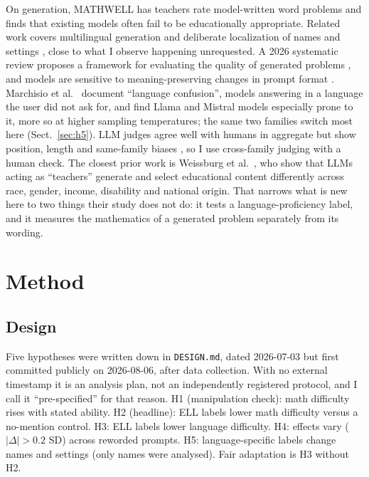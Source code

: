 \documentclass[runningheads,a4paper]{llncs}
\begin{document}
On generation, MATHWELL \cite{christ2024} has teachers rate model-written word problems and finds that existing models often fail to be educationally appropriate. Related work covers multilingual generation \cite{gamage2025,niyarepola2022} and deliberate localization of names and settings \cite{azime2026}, close to what I observe happening unrequested. A 2026 systematic review proposes a framework for evaluating the quality of generated problems \cite{utami2026}, and models are sensitive to meaning-preserving changes in prompt format \cite{sclar2023}. Marchisio et al.\ \cite{marchisio2024} document ``language confusion'', models answering in a language the user did not ask for, and find Llama and Mistral models especially prone to it, more so at higher sampling temperatures; the same two families switch most here (Sect.~\ref{sec:h5}). LLM judges agree well with humans in aggregate but show position, length and same-family biases \cite{zheng2023}, so I use cross-family judging with a human check. The closest prior work is Weissburg et al.\ \cite{weissburg2025}, who show that LLMs acting as ``teachers'' generate and select educational content differently across race, gender, income, disability and national origin. That narrows what is new here to two things their study does not do: it tests a language-proficiency label, and it measures the mathematics of a generated problem separately from its wording.

\section{Method}\label{sec:method}

\subsection{Design}\label{sec:design}

Five hypotheses were written down in \texttt{DESIGN.md}, dated 2026-07-03 but first committed publicly on 2026-08-06, after data collection. With no external timestamp it is an analysis plan, not an independently registered protocol, and I call it ``pre-specified'' for that reason. H1 (manipulation check): math difficulty rises with stated ability. H2 (headline): ELL labels lower math difficulty versus a no-mention control. H3: ELL labels lower language difficulty. H4: effects vary ($|\Delta|>0.2$ SD) across reworded prompts. H5: language-specific labels change names and settings (only names were analysed). Fair adaptation is H3 without H2.
\end{document}
